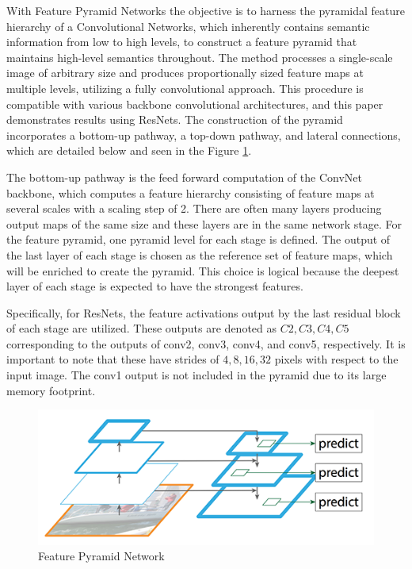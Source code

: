 With Feature Pyramid Networks \cite{fpn} the objective is to harness the pyramidal feature hierarchy of a Convolutional Networks, which inherently contains semantic 
information from low to high levels, to construct a feature pyramid that maintains high-level semantics throughout. The method processes a single-scale 
image of arbitrary size and produces proportionally sized feature maps at multiple levels, utilizing a fully convolutional approach. This procedure is 
compatible with various backbone convolutional architectures, and this paper demonstrates results using ResNets. The construction of the pyramid incorporates 
a bottom-up pathway, a top-down pathway, and lateral connections, which are detailed below and seen in the Figure \ref{fig:fpn}.

The bottom-up pathway is the feed forward computation of the ConvNet backbone, which computes a feature hierarchy consisting of feature maps at several scales 
with a scaling step of 2. There are often many layers producing output maps of the same size and these layers are in the same network stage. For the 
feature pyramid, one pyramid level for each stage is defined. The output of the last layer of each stage is chosen as the reference set of feature maps, 
which will be enriched to create the pyramid. This choice is logical because the deepest layer of each stage is expected to have the strongest features.

Specifically, for ResNets, the feature activations output by the last residual block of each stage are utilized. These outputs are denoted as ${C2, C3, C4, C5}$ 
corresponding to the outputs of conv2, conv3, conv4, and conv5, respectively. It is important to note that these have strides of ${4, 8, 16, 32}$ pixels with 
respect to the input image. The conv1 output is not included in the pyramid due to its large memory footprint.

\begin{figure}[h!]
    \centering
    \includegraphics[scale=0.5]{Figures/fpn-base.png}
    \caption{Feature Pyramid Network \cite{fpn}}
    \label{fig:fpn}
\end{figure}


